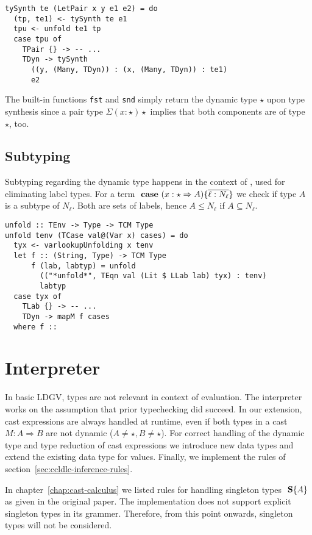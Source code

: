 \begin{lstlisting}[caption=Pair type synthesis (\texttt{TCTyping.hs})]
tySynth te (LetPair x y e1 e2) = do
  (tp, te1) <- tySynth te e1
  tpu <- unfold te1 tp
  case tpu of
    TPair {} -> -- ...
    TDyn -> tySynth
      ((y, (Many, TDyn)) : (x, (Many, TDyn)) : te1)
      e2
\end{lstlisting}

The built-in functions \texttt{fst} and \texttt{snd} simply return the dynamic type $\star$ upon type synthesis since a pair type $\Sigma(x:\star)\star$ implies that both components are of type $\star$, too.

\subsection{Subtyping}

Subtyping regarding the dynamic type happens in the context of \case, used for eliminating label types. For a term $\text{ \textbf{case} } (x:\star \Rightarrow A) \{ \overline{\ell : N_\ell} \}$ we check if type $A$ is a subtype of $N_\ell$. Both are sets of labels, hence $A \leq N_\ell$ if $A \subseteq N_\ell$.

\begin{lstlisting}[caption=Subtyping in case terms (\texttt{TCSubtyping.hs})]
unfold :: TEnv -> Type -> TCM Type
unfold tenv (TCase val@(Var x) cases) = do
  tyx <- varlookupUnfolding x tenv
  let f :: (String, Type) -> TCM Type
      f (lab, labtyp) = unfold
        (("*unfold*", TEqn val (Lit $ LLab lab) tyx) : tenv)
        labtyp
  case tyx of
    TLab {} -> -- ...
    TDyn -> mapM f cases
  where f ::
\end{lstlisting}

\section{Interpreter}

In basic LDGV, types are not relevant in context of evaluation. The interpreter works on the assumption that prior typechecking did succeed. In our extension, cast expressions are always handled at runtime, even if both types in a cast $M : A \Rightarrow B$ are not dynamic ($A \neq \star, B \neq \star$).
For correct handling of the dynamic type and type reduction of cast expressions we introduce new data types and extend the existing data type for values. Finally, we implement the rules of section~\ref{sec:ccldlc-inference-rules}.

In chapter~\ref{chap:cast-calculus} we listed rules for handling singleton types $\text{ \textbf{S}}\{A\}$ as given in the original paper. The implementation does not support explicit singleton types in its grammer. Therefore, from this point onwards, singleton types will not be considered.

